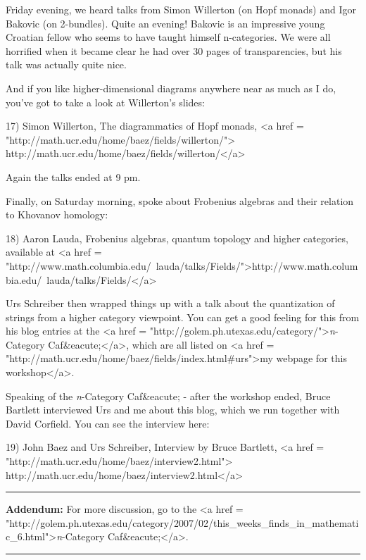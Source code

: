 Friday evening, we heard talks from Simon Willerton (on Hopf monads)
and Igor Bakovic (on 2-bundles).  Quite an evening!  Bakovic is an
impressive young Croatian fellow who seems to have taught himself
n-categories.  We were all horrified when it became clear he had over
30 pages of transparencies, but his talk was actually quite nice.  

And if you like higher-dimensional diagrams anywhere near as much 
as I do, you've got to take a look at Willerton's slides:

17) Simon Willerton, 
The diagrammatics of Hopf monads, 
<a href = "http://math.ucr.edu/home/baez/fields/willerton/">
http://math.ucr.edu/home/baez/fields/willerton/</a>

Again the talks ended at 9 pm.

Finally, on Saturday morning, spoke about Frobenius algebras and
their relation to Khovanov homology:

18) Aaron Lauda, Frobenius algebras, quantum topology and higher 
categories, available at 
<a href = "http://www.math.columbia.edu/~lauda/talks/Fields/">http://www.math.columbia.edu/~lauda/talks/Fields/</a>

Urs Schreiber then wrapped things up with a talk about the
quantization of strings from a higher category viewpoint.  You can get
a good feeling for this from his blog entries at the
<a href = "http://golem.ph.utexas.edu/category/">\emph{n}-Category Caf&eacute;</a>, which are all listed on <a href = "http://math.ucr.edu/home/baez/fields/index.html#urs">my webpage
for this workshop</a>.

Speaking of the \emph{n}-Category Caf&eacute; - after the workshop
ended, Bruce Bartlett interviewed Urs and me about this blog, which
we run together with David Corfield.  You can see the interview here:

19) John Baez and Urs Schreiber, Interview by Bruce Bartlett, 
<a href = "http://math.ucr.edu/home/baez/interview2.html">
http://math.ucr.edu/home/baez/interview2.html</a>  


\par\noindent\rule{\textwidth}{0.4pt}
\textbf{Addendum:} For more discussion, go to the <a href = "http://golem.ph.utexas.edu/category/2007/02/this_weeks_finds_in_mathematic_6.html">\emph{n}-Category
Caf&eacute;</a>.



\par\noindent\rule{\textwidth}{0.4pt}
